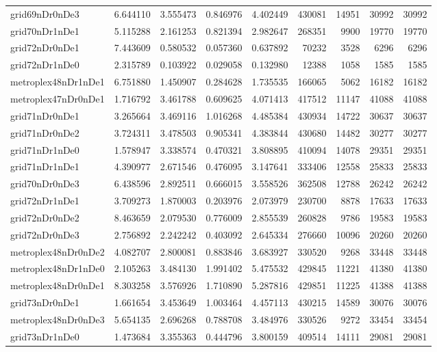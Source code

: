 \begin{longtable}{|l|r|r|r|r|r|r|r|r|}
grid69nDr0nDe3 & 6.644110 & 3.555473 & 0.846976 & 4.402449 & 430081 & 14951 & 30992 & 30992 \\
grid70nDr1nDe1 & 5.115288 & 2.161253 & 0.821394 & 2.982647 & 268351 & 9900 & 19770 & 19770 \\
grid72nDr0nDe1 & 7.443609 & 0.580532 & 0.057360 & 0.637892 & 70232 & 3528 & 6296 & 6296 \\
grid72nDr1nDe0 & 2.315789 & 0.103922 & 0.029058 & 0.132980 & 12388 & 1058 & 1585 & 1585 \\
metroplex48nDr1nDe1 & 6.751880 & 1.450907 & 0.284628 & 1.735535 & 166065 & 5062 & 16182 & 16182 \\
metroplex47nDr0nDe1 & 1.716792 & 3.461788 & 0.609625 & 4.071413 & 417512 & 11147 & 41088 & 41088 \\
grid71nDr0nDe1 & 3.265664 & 3.469116 & 1.016268 & 4.485384 & 430934 & 14722 & 30637 & 30637 \\
grid71nDr0nDe2 & 3.724311 & 3.478503 & 0.905341 & 4.383844 & 430680 & 14482 & 30277 & 30277 \\
grid71nDr1nDe0 & 1.578947 & 3.338574 & 0.470321 & 3.808895 & 410094 & 14078 & 29351 & 29351 \\
grid71nDr1nDe1 & 4.390977 & 2.671546 & 0.476095 & 3.147641 & 333406 & 12558 & 25833 & 25833 \\
grid70nDr0nDe3 & 6.438596 & 2.892511 & 0.666015 & 3.558526 & 362508 & 12788 & 26242 & 26242 \\
grid72nDr1nDe1 & 3.709273 & 1.870003 & 0.203976 & 2.073979 & 230700 & 8878 & 17633 & 17633 \\
grid72nDr0nDe2 & 8.463659 & 2.079530 & 0.776009 & 2.855539 & 260828 & 9786 & 19583 & 19583 \\
grid72nDr0nDe3 & 2.756892 & 2.242242 & 0.403092 & 2.645334 & 276660 & 10096 & 20260 & 20260 \\
metroplex48nDr0nDe2 & 4.082707 & 2.800081 & 0.883846 & 3.683927 & 330520 & 9268 & 33448 & 33448 \\
metroplex48nDr1nDe0 & 2.105263 & 3.484130 & 1.991402 & 5.475532 & 429845 & 11221 & 41380 & 41380 \\
metroplex48nDr0nDe1 & 8.303258 & 3.576926 & 1.710890 & 5.287816 & 429851 & 11225 & 41388 & 41388 \\
grid73nDr0nDe1 & 1.661654 & 3.453649 & 1.003464 & 4.457113 & 430215 & 14589 & 30076 & 30076 \\
metroplex48nDr0nDe3 & 5.654135 & 2.696268 & 0.788708 & 3.484976 & 330526 & 9272 & 33454 & 33454 \\
grid73nDr1nDe0 & 1.473684 & 3.355363 & 0.444796 & 3.800159 & 409514 & 14111 & 29081 & 29081 \\

\end{longtable}
